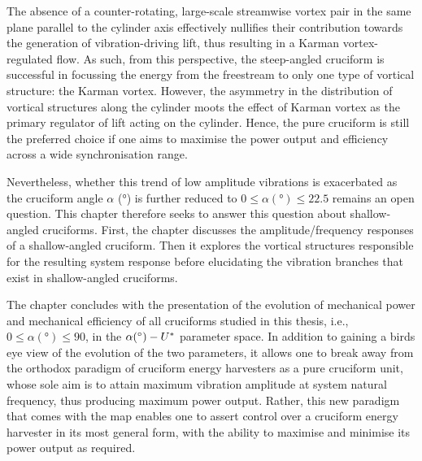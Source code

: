 \documentclass[oneside]{utmthesis}
\begin{document}
The absence of a counter-rotating, large-scale streamwise vortex pair in the same plane parallel to the cylinder axis effectively nullifies their contribution towards the generation of vibration-driving lift, thus resulting in a Karman vortex-regulated flow. As such, from this perspective, the steep-angled cruciform is successful in focussing the energy from the freestream to only one type of vortical structure: the Karman vortex. However, the asymmetry in the distribution of vortical structures along the cylinder moots the effect of Karman vortex as the primary regulator of lift acting on the cylinder. Hence, the pure cruciform is still the preferred choice if one aims to maximise the power output and efficiency across a wide synchronisation range.

Nevertheless, whether this trend of low amplitude vibrations is exacerbated as the cruciform angle $\alpha$ (\si{\degree}) is further reduced to $0 \leq \alpha (\si{\degree}) \leq 22.5$ remains an open question. This chapter therefore seeks to answer this question about shallow-angled cruciforms. First, the chapter discusses the amplitude/frequency responses of a shallow-angled cruciform. Then it explores the vortical structures responsible for the resulting system response before elucidating the vibration branches that exist in shallow-angled cruciforms.

The chapter concludes with the presentation of the evolution of mechanical power and mechanical efficiency of all cruciforms studied in this thesis, i.e., $0 \leq \alpha (\si{\degree}) \leq 90$, in the $\alpha (\si{\degree}) - \ured$ parameter space. In addition to gaining a birds eye view of the evolution of the two parameters, it allows one to break away from the orthodox paradigm of cruciform energy harvesters as a pure cruciform unit, whose sole aim is to attain maximum vibration amplitude at system natural frequency, thus producing maximum power output. Rather, this new paradigm that comes with the map enables one to assert control over a cruciform energy harvester in its most general form, with the ability to maximise and minimise its power output as required.
\end{document}
